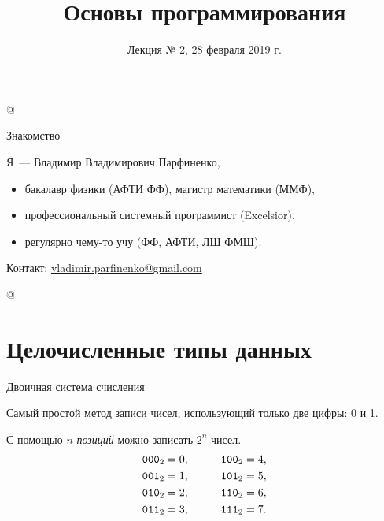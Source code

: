 %





\title{Основы программирования}
\subtitle{Лекция № 2, 28 февраля 2019 г.}
\date{}




\lstMakeShortInline[style=inlineC]@

\begin{frame}[plain]
  \titlepage
\end{frame}

\lstDeleteShortInline@
\begin{frame}{Знакомство}

  Я~--- Владимир Владимирович Парфиненко,

  \begin{itemize}
    \item бакалавр физики (АФТИ ФФ), магистр математики (ММФ),
    \item профессиональный системный программист (Excelsior),
    \item регулярно чему-то учу (ФФ, АФТИ, ЛШ ФМШ).
  \end{itemize}


  Контакт:
  \href{mailto:vladimir.parfinenko@gmail.com}{vladimir.parfinenko@gmail.com}

\end{frame}
\lstMakeShortInline[style=inlineC]@

\section{Целочисленные типы данных}

\begin{frame}{Двоичная система счисления}

  Самый простой метод записи чисел, использующий только две цифры: 0 и 1.

  С помощью $n$ \emph{позиций} можно записать $2^n$ чисел.
  \begin{align*}
    \mathtt{000}_2 &= 0, &\qquad \mathtt{100}_2 &= 4, \\
    \mathtt{001}_2 &= 1, &\qquad \mathtt{101}_2 &= 5, \\
    \mathtt{010}_2 &= 2, &\qquad \mathtt{110}_2 &= 6, \\
    \mathtt{011}_2 &= 3, &\qquad \mathtt{111}_2 &= 7.
  \end{align*}

\end{frame}


